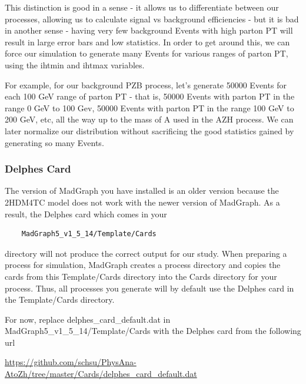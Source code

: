 \documentclass{article}
\begin{document}
\bigskip

This distinction is good in a sense - it allows us to differentiate between
our processes, allowing us to calculate signal vs background efficiencies - but it is bad in another sense - having very few background Events
with high parton PT will result in large error bars and low statistics. In order to get around this, we can force our simulation to generate
many Events for various ranges of parton PT, using the ihtmin and ihtmax variables.

\bigskip

For example, for our background PZB process, let's generate
50000 Events for each 100 GeV range of parton PT - that is, 50000 Events with parton PT in the range 0 GeV to 100 Gev, 50000 Events with parton
PT in the range 100 GeV to 200 GeV, etc, all the way up to the mass of A used in the AZH process. We can later normalize our distribution without
sacrificing the good statistics gained by generating so many Events.

\subsubsection{Delphes Card}
\label{sec:delphesCard}

The version of MadGraph you have installed is an older version because the 2HDM4TC model does
not work with the newer version of MadGraph. As a result, the Delphes card which comes in your

\begin{verbatim}
	MadGraph5_v1_5_14/Template/Cards
\end{verbatim}

directory will not produce the correct output for our study. When preparing a process for
simulation, MadGraph creates a process directory and copies the cards from this Template/Cards
directory into the Cards directory for your process. Thus, all processes you generate will by
default use the Delphes card in the Template/Cards directory.

\bigskip

For now, replace delphes\_card\_default.dat in MadGraph5\_v1\_5\_14/Template/Cards with the Delphes card from the following url

\bigskip

\url{https://github.com/schsu/PhysAna-AtoZh/tree/master/Cards/delphes_card_default.dat}

\bigskip
\end{document}
